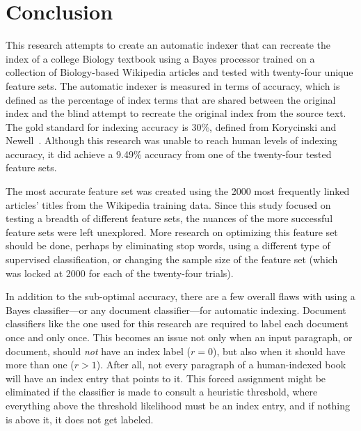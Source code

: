 \pagebreak
\section{Conclusion}

This research attempts to create an automatic indexer that can recreate the index of a college Biology textbook using a \naive Bayes processor trained on a collection of Biology-based Wikipedia articles and tested with twenty-four unique feature sets.
The automatic indexer is measured in terms of accuracy, which is defined as the percentage of index terms that are shared between the original index and the blind attempt to recreate the original index from the source text.
The gold standard for indexing accuracy is 30\%, defined from Korycinski and Newell~\cite{automatic-indexing}.
Although this research was unable to reach human levels of indexing accuracy, it did achieve a 9.49\% accuracy from one of the twenty-four tested feature sets.

The most accurate feature set was created using the 2000 most frequently linked articles' titles from the Wikipedia training data.
Since this study focused on testing a breadth of different feature sets, the nuances of the more successful feature sets were left unexplored.
More research on optimizing this feature set should be done, perhaps by eliminating stop words, using a different type of supervised classification, or changing the sample size of the feature set (which was locked at 2000 for each of the twenty-four trials).

In addition to the sub-optimal accuracy, there are a few overall flaws with using a \naive Bayes classifier---or any document classifier---for automatic indexing.
Document classifiers like the one used for this research are required to label each document once and only once.
This becomes an issue not only when an input paragraph, or document, should {\it not} have an index label ($r = 0$), but also when it should have more than one ($r > 1$).
After all, not every paragraph of a human-indexed book will have an index entry that points to it.
This forced assignment might be eliminated if the classifier is made to consult a heuristic threshold, where everything above the threshold likelihood must be an index entry, and if nothing is above it, it does not get labeled.

